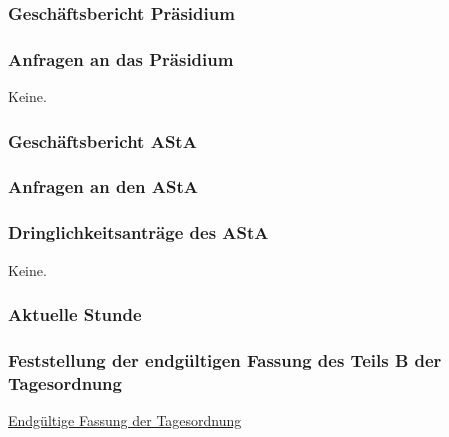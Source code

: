 \documentclass[ngerman,headheight=70pt]{scrartcl}
\begin{document}
    \subsubsection{Geschäftsbericht Präsidium}

    \subsubsection{Anfragen an das Präsidium}

    Keine.

    \subsubsection{Geschäftsbericht AStA}


    \subsubsection{Anfragen an den AStA}


    \subsubsection{Dringlichkeitsanträge des AStA}

    Keine.

    \subsubsection{Aktuelle Stunde}

    \subsubsection{Feststellung der endgültigen Fassung des Teils B der Tagesordnung}
    \newpage
    \underline{Endgültige Fassung der Tagesordnung}
\end{document}
